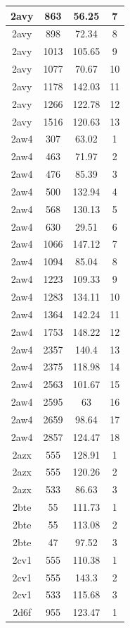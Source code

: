 \begin{center}
\begin{longtable}{c|c|c|c}
2avy & 863 & 56.25 & 7 \\ \hline
2avy & 898 & 72.34 & 8 \\ \hline
2avy & 1013 & 105.65 & 9 \\ \hline
2avy & 1077 & 70.67 & 10 \\ \hline
2avy & 1178 & 142.03 & 11 \\ \hline
2avy & 1266 & 122.78 & 12 \\ \hline
2avy & 1516 & 120.63 & 13 \\ \hline
2aw4 & 307 & 63.02 & 1 \\ \hline
2aw4 & 463 & 71.97 & 2 \\ \hline
2aw4 & 476 & 85.39 & 3 \\ \hline
2aw4 & 500 & 132.94 & 4 \\ \hline
2aw4 & 568 & 130.13 & 5 \\ \hline
2aw4 & 630 & 29.51 & 6 \\ \hline
2aw4 & 1066 & 147.12 & 7 \\ \hline
2aw4 & 1094 & 85.04 & 8 \\ \hline
2aw4 & 1223 & 109.33 & 9 \\ \hline
2aw4 & 1283 & 134.11 & 10 \\ \hline
2aw4 & 1364 & 142.24 & 11 \\ \hline
2aw4 & 1753 & 148.22 & 12 \\ \hline
2aw4 & 2357 & 140.4 & 13 \\ \hline
2aw4 & 2375 & 118.98 & 14 \\ \hline
2aw4 & 2563 & 101.67 & 15 \\ \hline
2aw4 & 2595 & 63 & 16 \\ \hline
2aw4 & 2659 & 98.64 & 17 \\ \hline
2aw4 & 2857 & 124.47 & 18 \\ \hline
2azx & 555 & 128.91 & 1 \\ \hline
2azx & 555 & 120.26 & 2 \\ \hline
2azx & 533 & 86.63 & 3 \\ \hline
2bte & 55 & 111.73 & 1 \\ \hline
2bte & 55 & 113.08 & 2 \\ \hline
2bte & 47 & 97.52 & 3 \\ \hline
2cv1 & 555 & 110.38 & 1 \\ \hline
2cv1 & 555 & 143.3 & 2 \\ \hline
2cv1 & 533 & 115.68 & 3 \\ \hline
2d6f & 955 & 123.47 & 1 \\ \hline

\end{longtable}
\end{center}
